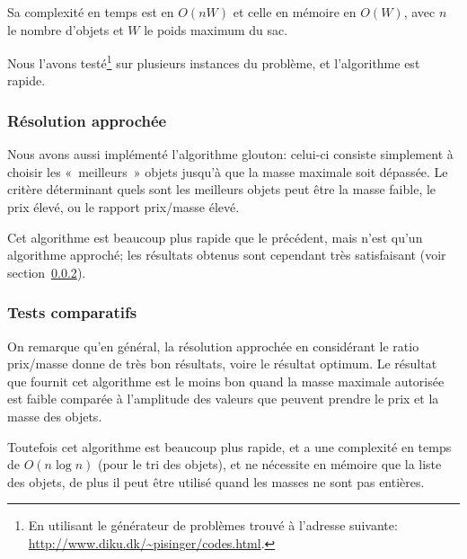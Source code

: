     Sa complexité en temps est en $O(nW)$ et celle en mémoire en $O(W)$, avec
    $n$ le nombre d'objets et $W$ le poids maximum du sac.

    Nous l'avons testé\footnote{En utilisant le générateur de problèmes trouvé
    à l'adresse suivante: \url{http://www.diku.dk/~pisinger/codes.html}.} sur
    plusieurs instances du problème, et l'algorithme est rapide.


  \subsubsection{Résolution approchée}
    Nous avons aussi implémenté l'algorithme glouton: celui-ci consiste
    simplement à choisir les «~meilleurs~» objets jusqu'à que la masse maximale
    soit dépassée. Le critère déterminant quels sont les meilleurs objets peut
    être la masse faible, le prix élevé, ou le rapport prix/masse élevé.

    Cet algorithme est beaucoup plus rapide que le précédent, mais n'est qu'un
    algorithme approché; les résultats obtenus sont cependant très
    satisfaisant (voir section~\ref{sec:knapsack:tests}).

  \subsubsection{Tests comparatifs}\label{sec:knapsack:tests}
    On remarque qu'en général, la résolution approchée en considérant le ratio
    \nobreak prix/masse donne de très bon résultats, voire le résultat
    optimum. Le résultat que fournit cet algorithme est le moins bon quand la
    masse maximale autorisée est faible comparée à l'amplitude des valeurs que
    peuvent prendre le prix et la masse des objets.
    
    Toutefois cet algorithme est beaucoup plus rapide, et a une complexité en
    temps de $O(n \log n)$ (pour le tri des objets), et ne nécessite en mémoire
    que la liste des objets, de plus il peut être utilisé quand les masses ne
    sont pas entières.

